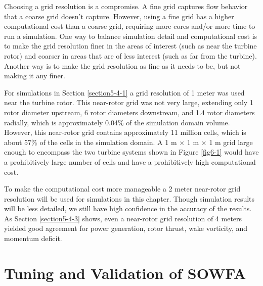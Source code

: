 Choosing a grid resolution is a compromise. A fine grid captures flow behavior that a coarse grid doesn't capture. However, using a fine grid has a higher computational cost than a coarse grid, requiring more cores and/or more time to run a simulation. One way to balance simulation detail and computational cost is to make the grid resolution finer in the areas of interest (such as near the turbine rotor) and coarser in areas that are of less interest (such as far from the turbine). Another way is to make the grid resolution as fine as it needs to be, but not making it any finer. 

For simulations in Section \ref{section5-4-1} a grid resolution of 1 meter was used near the turbine rotor. This near-rotor grid was not very large, extending only 1 rotor diameter upstream, 6 rotor diameters downstream, and 1.4 rotor diameters radially, which is approximately 0.04\% of the simulation domain volume. However, this near-rotor grid contains approximately 11 million cells, which is about 57\% of the cells in the simulation domain. A 1 m $\times$ 1 m $\times$ 1 m grid large enough to encompass the two turbine systems shown in Figure \ref{fig6-1} would have a prohibitively large number of cells and have a prohibitively high computational cost. 

To make the computational cost more manageable a 2 meter near-rotor grid resolution will be used for simulations in this chapter. Though simulation results will be less detailed, we still have high confidence in the accuracy of the results. As Section \ref{section5-4-3} shows, even a near-rotor grid resolution of 4 meters yielded good agreement for power generation, rotor thrust, wake vorticity, and momentum deficit.  


\section{Tuning and Validation of SOWFA} \label{section6-4}

